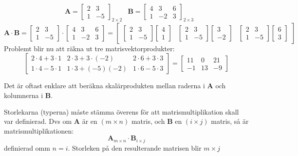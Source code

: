 \begin{Ex}
   \begin{align*}
   &\mathbf{A} = \begin{bmatrix} 2&3\\1&-5 \end{bmatrix}_{2 \times 2} &\mathbf{B} = \begin{bmatrix} 4&3&6\\1&-2&3 \end{bmatrix}_{2 \times 3}
   \end{align*}
   \[
       \mathbf{A} \cdot \mathbf{B} = \begin{bmatrix} 2&3\\1&-5 \end{bmatrix} \cdot \begin{bmatrix} 4&3&6\\1&-2&3 \end{bmatrix} = \begin{bmatrix} \begin{bmatrix} 2&3\\1&-5 \end{bmatrix}\begin{bmatrix} 4\\1 \end{bmatrix} &\begin{bmatrix} 2&3\\1&-5 \end{bmatrix}\begin{bmatrix} 3\\-2 \end{bmatrix} &\begin{bmatrix} 2&3\\1&-5 \end{bmatrix} \begin{bmatrix} 6\\3 \end{bmatrix} \end{bmatrix}
   \]
   Problemt blir nu att räkna ut tre matrisvektorprodukter:
   \[
       \begin{bmatrix} 2 \cdot 4 + 3 \cdot 1 & 2 \cdot 3 + 3 \cdot (-2) & 2 \cdot 6	+ 3 \cdot 3 \\ 1 \cdot 4 - 5 \cdot 1 & 1 \cdot 3 + (-5)(-2) & 1 \cdot 6 - 5 \cdot 3 \end{bmatrix} = \begin{bmatrix} 11&0&21\\-1&13&-9 \end{bmatrix}
   \]
\end{Ex}
Det är oftast enklare att beräkna skalärprodukten mellan raderna i \textbf{A} och kolumnerna i \textbf{B}.
\begin{Rem}
    Storlekarna (typerna) måste stämma överens för att matrismultiplikation skall var definierad. Dvs om \textbf{A} är en $(m \times n)$ matris, och \textbf{B} en $(i \times j)$ matris, så är matrismultiplikationen:
    \[
        \mathbf{A}_{m \times n} \cdot \mathbf{B}_{i \times j}
    \]
    definierad omm $n = i$. Storleken på den resulterande matrisen blir $m \times j$
\end{Rem}
